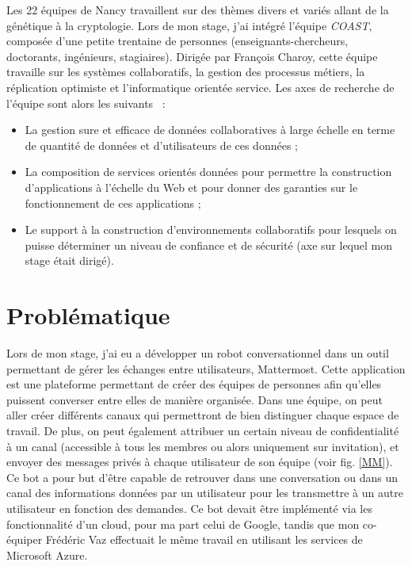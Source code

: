 \documentclass[stage2a]{tnreport} %
\begin{document}
Les 22 équipes de Nancy travaillent sur des thèmes divers et variés allant de la génétique à la cryptologie. Lors de mon stage, j'ai intégré l'équipe \emph{COAST}, composée d'une petite trentaine de personnes (enseignants-chercheurs, doctorants, ingénieurs, stagiaires). Dirigée par François Charoy, cette équipe travaille sur les systèmes collaboratifs, la gestion des processus métiers, la réplication optimiste et l'informatique orientée service. Les axes de recherche de l'équipe sont alors les suivants ~\cite{COAST}: 
\begin{itemize}
    \item  La gestion sure et efficace de données collaboratives à large échelle en terme de quantité de données et d’utilisateurs de ces données ;
    \item La composition de services orientés données pour permettre la construction d’applications à l’échelle du Web et pour donner des garanties sur le fonctionnement de ces applications ;
    \item Le support à la construction d’environnements collaboratifs pour lesquels on puisse déterminer un niveau de confiance et de sécurité (axe sur lequel mon stage était dirigé).
\end{itemize}

\clearpage

\chapter{Problématique}

Lors de mon stage, j'ai eu a développer un robot conversationnel dans un outil permettant de gérer les échanges entre utilisateurs, Mattermost. Cette application est une plateforme permettant de créer des équipes de personnes afin qu'elles puissent converser entre elles de manière organisée. Dans une équipe, on peut aller créer différents canaux qui permettront de bien distinguer chaque espace de travail. De plus, on peut également attribuer un certain niveau de confidentialité à un canal (accessible à tous les membres ou alors uniquement sur invitation), et envoyer des messages privés à chaque utilisateur de son équipe (voir fig. \ref{MM}). Ce bot a pour but d'être capable de retrouver dans une conversation ou dans un canal des informations données par un utilisateur pour les transmettre à un autre utilisateur en fonction des demandes. Ce bot devait être implémenté via les fonctionnalité d'un cloud, pour ma part celui de Google, tandis que mon co-équiper Frédéric Vaz effectuait le même travail en utilisant les services de Microsoft Azure. \\
\end{document}
